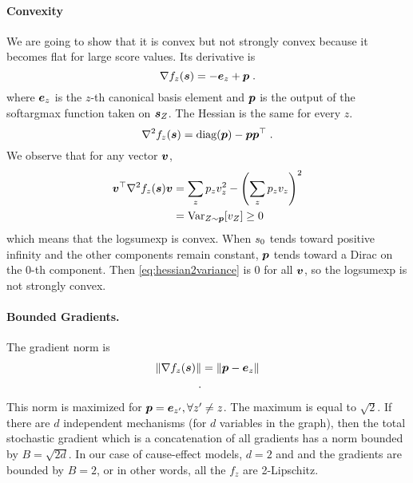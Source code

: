 \begin{subappendices}
\paragraph{Convexity}
We are going to show that it is convex but not strongly convex because it becomes flat for large score values.
Its derivative is
\begin{equation}
    \nabla f_z({\bm{s}}) = -{\bm{e}}_z + {\bm{p}} \; .
\end{equation}
where ${\bm{e}}_z$ is the $z$-th canonical basis element  and ${\bm{p}}$ is the output of the softargmax function taken on ${\bm{s}}_Z$.
The Hessian is the same for every $z$.
\begin{equation}
    \nabla^2 f_z({\bm{s}}) = \text{diag}({\bm{p}}) - {\bm{p}} {\bm{p}}^\top \; .
\end{equation}
We observe that for any vector ${\bm{v}}$,
\begin{align}
    \label{eq:hessian2variance}
    {\bm{v}}^\top \nabla^2 f_z({\bm{s}}) {\bm{v}} &= \sum_z {p}_z{v}_z^2 - \left(\sum_z {p}_z {v}_z \right)^2 \nonumber \\
    &= \operatorname{\mathrm{Var}}_{Z\sim {\bm{p}}}[v_Z] \geq 0
\end{align}
which means that the logsumexp is convex. 
When ${s}_0$ tends toward positive infinity and the other components remain constant, ${\bm{p}}$ tends toward a Dirac on the 0-th component.
Then \eqref{eq:hessian2variance} is 0 for all ${\bm{v}}$, so the logsumexp is not strongly convex.


\paragraph{Bounded Gradients.}
The gradient norm is
\begin{align}
    \label{eq:cat_grd_uppr_bnd}
    \|\nabla f_z({\bm{s}}) \|
    &= \|{\bm{p}} -{\bm{e}}_z\| \\ \; .
\end{align}
This norm is maximized for ${\bm{p}}={\bm{e}}_{z'}, \forall z' \neq z$.
The maximum is equal to $\sqrt{2}$.
If there are $d$ independent mechanisms (for $d$ variables in the graph), then the total stochastic gradient which is a concatenation of all gradients has a norm bounded by $B=\sqrt{2d}$. 
In our case of cause-effect models, $d=2$ and and the gradients are bounded by $B=2$, or in other words, all the $f_z$  are 2-Lipschitz.


\end{subappendices}
